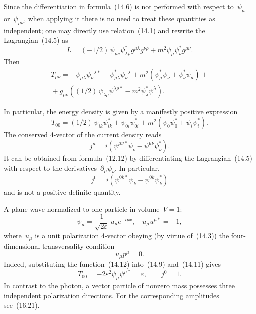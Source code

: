 Since the differentiation in formula~(14.6) is not performed with respect to~$\psi_\mu$ or~$\psi_{\mu\nu}$, when applying it there is no need to treat these quantities as independent; one may directly use relation~(14.1) and rewrite the Lagrangian~(14.5) as
\begin{equation}
L = (-1/2)\,\psi_{\mu\nu}\psi^*_{\lambda\rho}g^{\mu\lambda}g^{\nu\rho} + m^2\psi_\mu\psi^*_\nu g^{\mu\nu}.
\tag{14.7}
\end{equation}
Then
\begin{multline}
T_{\mu\nu} = -\psi_{\mu\lambda}\psi_\nu{}^{\lambda*} - \psi^*_{\mu\lambda}\psi_\nu{}^\lambda + m^2\left(\psi^*_\mu\psi_\nu + \psi^*_\nu\psi_\mu\right) +{}\\
{}+ g_{\mu\nu}\left((1/2)\,\psi_{\lambda\rho}\psi^{\lambda\rho*} - m^2\psi^*_\lambda\psi^\lambda\right).
\tag{14.8}
\end{multline}

In particular, the energy density is given by a manifestly positive expression
\begin{equation}
T_{00} = (1/2)\,\psi_{ik}\psi^*_{ik} + \psi_{0i}\psi^*_{0i} + m^2\left(\psi_0\psi^*_0 + \psi_i\psi^*_i\right).
\tag{14.9}
\end{equation}
The conserved 4-vector of the current density reads
\begin{equation}
j^\mu = i\left(\psi^{\mu\nu*}\psi_\nu - \psi^{\mu\nu}\psi^*_\nu\right).
\tag{14.10}
\end{equation}
It can be obtained from formula~(12.12) by differentiating the Lagrangian~(14.5) with respect to the derivatives~$\partial_\mu\psi_\nu$. In particular,
\begin{equation}
j^0 = i\left(\psi^{0k*}\psi_k - \psi^{0k}\psi^*_k\right)
\tag{14.11}
\end{equation}
and is not a positive-definite quantity.

A plane wave normalized to one particle in volume~$V = 1$:
\begin{equation}
\psi_\mu = \frac{1}{\sqrt{2\varepsilon}}\,u_\mu e^{-ipx}, \quad u_\mu u^{\mu*} = -1,
\tag{14.12}
\end{equation}
where~$u_\mu$ is a unit polarization 4-vector obeying (by virtue of~(14.3)) the four-dimensional transversality condition
\begin{equation}
u_\mu p^\mu = 0.
\tag{14.13}
\end{equation}
Indeed, substituting the function~(14.12) into~(14.9) and~(14.11) gives
\[
T_{00} = -2\varepsilon^2\psi_\mu\psi^{\mu*} = \varepsilon, \qquad j^0 = 1.
\]
In contrast to the photon, a vector particle of nonzero mass possesses three independent polarization directions. For the corresponding amplitudes see~(16.21).

